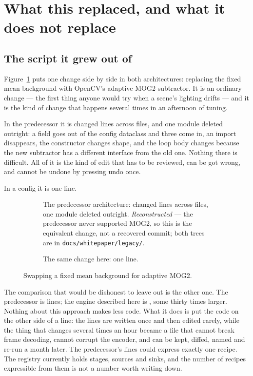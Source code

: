 \section{What this replaced, and what it does not replace}

\subsection{The script it grew out of}

Figure~\ref{fig:diff} puts one change side by side in both architectures:
replacing the fixed mean background with OpenCV's adaptive MOG2 subtractor. It is
an ordinary change --- the first thing anyone would try when a scene's lighting
drifts --- and it is the kind of change that happens several times in an
afternoon of tuning.

In the predecessor it is \LegacyChanged{} changed lines across \LegacyFiles{}
files, and one module deleted outright: a field goes out of the config dataclass
and three come in, an import disappears, the constructor changes shape, and the
loop body changes because the new subtractor has a different interface from the
old one. Nothing there is difficult. All of it is the kind of edit that has to be
reviewed, can be got wrong, and cannot be undone by pressing undo once.

In a config it is one line.

\begin{figure}[t]
  \begin{subfigure}[t]{\textwidth}
    
    \caption{The predecessor architecture: \LegacyChanged{} changed lines across
      \LegacyFiles{} files, one module deleted outright. \emph{Reconstructed} ---
      the predecessor never supported MOG2, so this is the equivalent change, not
      a recovered commit; both trees are in \texttt{docs/whitepaper/legacy/}.}
  \end{subfigure}

  \vspace{4mm}
  \begin{subfigure}[t]{\textwidth}
    
    \caption{The same change here: one line.}
  \end{subfigure}
  \caption{Swapping a fixed mean background for adaptive MOG2.}
  \label{fig:diff}
\end{figure}

The comparison that would be dishonest to leave out is the other one. The
predecessor is \LegacyLOC{} lines; the engine described here is \RepoLOC{}, some
thirty times larger. Nothing about this approach makes less code. What it does is
put the code on the other side of a line: the \RepoLOC{} lines are written once
and then edited rarely, while the thing that changes several times an hour became
a file that cannot break frame decoding, cannot corrupt the encoder, and can be
kept, diffed, named and re-run a month later. The predecessor's \LegacyLOC{}
lines could express exactly one recipe. The registry currently holds
\NumStages{} stages, \NumSources{} sources and \NumSinks{} sinks, and the number
of recipes expressible from them is not a number worth writing down.

